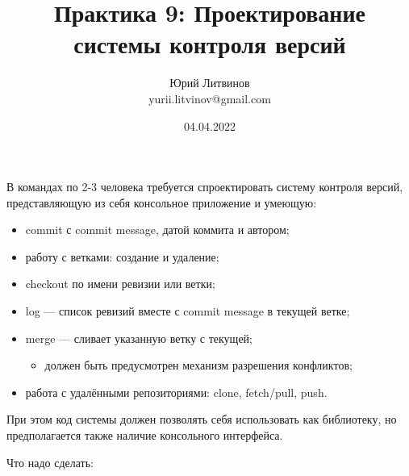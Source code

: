 \documentclass[a5paper]{article}
\title{Практика 9: Проектирование системы контроля версий}
\author{Юрий Литвинов\\\small{yurii.litvinov@gmail.com}}
\date{04.04.2022}
\begin{document}
\maketitle
\thispagestyle{empty}

В командах по 2-3 человека требуется спроектировать систему контроля версий, представляющую из себя консольное приложение и умеющую:

\begin{itemize}
    \item commit с commit message, датой коммита и автором;
    \item работу с ветками: создание и удаление;
    \item checkout по имени ревизии или ветки;
    \item log --- список ревизий вместе с commit message в текущей ветке;
    \item merge --- сливает указанную ветку с текущей;
    \begin{itemize}
        \item должен быть предусмотрен механизм разрешения конфликтов;
    \end{itemize}
    \item работа с удалёнными репозиториями: clone, fetch/pull, push.
\end{itemize}

При этом код системы должен позволять себя использовать как библиотеку, но предполагается также наличие консольного интерфейса.

Что надо сделать:
\end{document}

